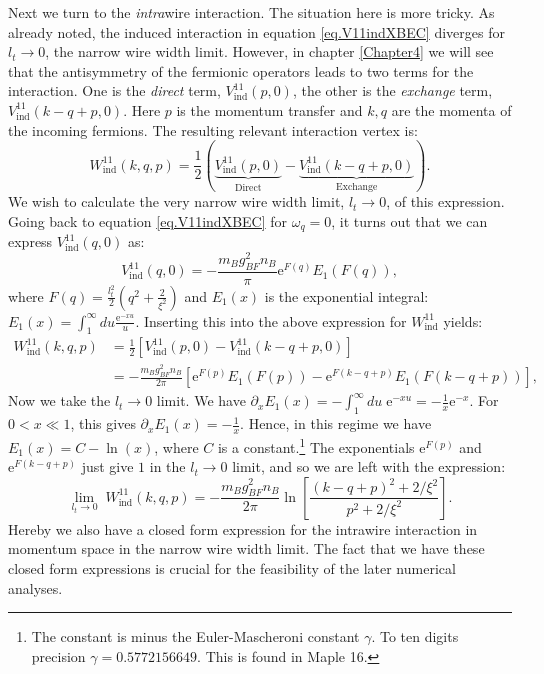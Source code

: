 Next we turn to the \textit{intra}wire interaction. The situation here is more tricky. As already noted, the induced interaction in equation \eqref{eq.V11indXBEC} diverges for $l_t \to 0$, the narrow wire width limit. However, in chapter \ref{Chapter4} we will see that the antisymmetry of the fermionic operators leads to two terms for the interaction. One is the \textit{direct} term, $V^{11}_{\text{ind}}\left( p, 0 \right)$, the other is the \textit{exchange} term, $V^{11}_{\text{ind}}\left( k - q + p, 0 \right)$. Here $p$ is the momentum transfer and $k, q$ are the momenta of the incoming fermions. The resulting relevant interaction vertex is: 
\begin{equation}
W^{11}_{\text{ind}}(k, q, p) = \frac{1}{2} ( \underset{\text{Direct}}{\underbrace{V^{11}_{\text{ind}}\left( p, 0 \right)}} - \underset{\text{Exchange}}{\underbrace{V^{11}_\text{ind}\left( k - q + p, 0 \right) }} ). 
\label{eq.Wkqp.scattering.amplitude}
\end{equation}
We wish to calculate the very narrow wire width limit, $l_t \to 0$, of this expression. Going back to equation \eqref{eq.V11indXBEC} for $\omega_q = 0$, it turns out that we can express $V^{11}_\text{ind}\left( q, 0 \right)$ as:
\begin{equation}
V^{11}_{\text{ind}}(q, 0) = -\frac{m_Bg_{BF}^2n_B}{\pi} \text{e}^{F(q)} E_1(F(q)),
\label{eq.V11indq.zerofrequency.ltnonzero}
\end{equation}
where $F(q) = \frac{l_t^2}{2}\left(q^2 + \frac{2}{\xi^2} \right)$ and $E_1(x)$ is the exponential integral: $E_1(x) = \int_1^\infty du \frac{\text{e}^{-xu}}{u}$. Inserting this into the above expression for $W^{11}_{\text{ind}}$ yields:
\begin{align}
W^{11}_{\text{ind}}(k, q, p) &= \frac{1}{2}\left[V^{11}_\text{ind}(p, 0) - V^{11}_\text{ind}(k - q + p, 0)\right] \nonumber \\
&= -\frac{m_Bg_{BF}^2n_B}{2\pi}\left[ \text{e}^{F(p)} E_1(F(p)) - \text{e}^{F(k - q + p)} E_1(F(k - q + p)) \right], \nonumber
\end{align}
Now we take the $l_t \to 0$ limit. We have $\partial_x E_1(x) = -\int_1^{\infty}du\; \text{e}^{-xu} = -\frac{1}{x}\text{e}^{-x}$. For $0 < x \ll 1$, this gives $\partial_xE_1(x) = -\frac{1}{x}$. Hence, in this regime we have $E_1(x) = C -\ln(x)$, where $C$ is a constant.\footnote{The constant is minus the Euler-Mascheroni constant $\gamma$. To ten digits precision $\gamma = 0.5772156649$. This is found in Maple 16.} The exponentials $\text{e}^{F(p)}$ and $\text{e}^{F(k - q + p)}$ just give $1$ in the $l_t \to 0$ limit, and so we are left with the expression:
\begin{equation}
\lim_{l_t \to 0} \; W^{11}_{\text{ind}}(k, q, p) = -\frac{m_Bg_{BF}^2n_B}{2\pi} \ln\left[\frac{(k - q + p)^2 + 2/\xi^2}{p^2 + 2/\xi^2}\right].
\label{eq.Wkqp.scattering.amplitude.lt=0} 
\end{equation}
Hereby we also have a closed form expression for the intrawire interaction in momentum space in the narrow wire width limit. The fact that we have these closed form expressions is crucial for the feasibility of the later numerical analyses.




